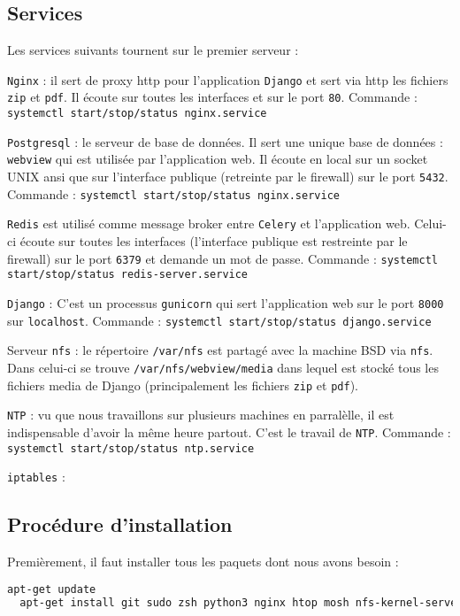 \documentclass[10pt,a4paper]{article}
\begin{document}
\subsection{Services}
Les services suivants tournent sur le premier serveur :

\texttt{Nginx} : il sert de proxy http pour l'application \texttt{Django} et sert via http les fichiers \texttt{zip} et \texttt{pdf}.
Il écoute sur toutes les interfaces et sur le port \texttt{80}.
Commande : \texttt{systemctl start/stop/status nginx.service}

\texttt{Postgresql} : le serveur de base de données.
Il sert une unique base de données : \texttt{webview} qui est utilisée par l'application web.
Il écoute en local sur un socket UNIX ansi que sur l'interface publique (retreinte par le firewall) sur le port \texttt{5432}.
Commande : \texttt{systemctl start/stop/status nginx.service}

\texttt{Redis} est utilisé comme message broker entre \texttt{Celery} et l'application web.
Celui-ci écoute sur toutes les interfaces (l'interface publique est restreinte par le firewall) sur le port \texttt{6379} et demande un mot de passe.
Commande : \texttt{systemctl start/stop/status redis-server.service}

\texttt{Django} : C'est un processus \texttt{gunicorn} qui sert l'application web sur le port \texttt{8000} sur \texttt{localhost}.
Commande : \texttt{systemctl start/stop/status django.service}

Serveur \texttt{nfs} : le répertoire \texttt{/var/nfs} est partagé avec la machine BSD via \texttt{nfs}.
Dans celui-ci se trouve \texttt{/var/nfs/webview/media} dans lequel est stocké tous les fichiers media de Django (principalement les fichiers \texttt{zip} et \texttt{pdf}).

\texttt{NTP} : vu que nous travaillons sur plusieurs machines en parralèlle, il est indispensable d'avoir la même heure partout.
C'est le travail de \texttt{NTP}.
Commande : \texttt{systemctl start/stop/status ntp.service}

\texttt{iptables} : %


\subsection{Procédure d'installation}

Premièrement, il faut installer tous les paquets dont nous avons besoin :
\begin{lstlisting}[language=bash]
  apt-get update
  apt-get install git sudo zsh python3 nginx htop mosh nfs-kernel-server vim redis-server postgresql-server python3 python3-dev ntpdate ntp screen iptables-persistent
\end{lstlisting}
\end{document}
